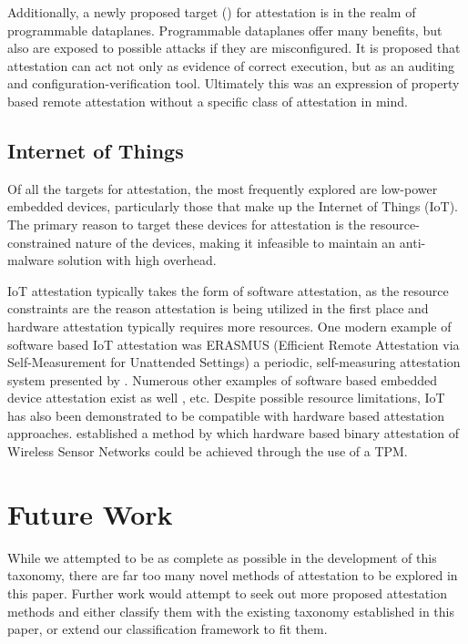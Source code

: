 \documentclass[acmsmall]{acmart}
\theoremstyle{definition}
\begin{document}
Additionally, a newly proposed target (\citet{sultanasy22acase}) for attestation is in the realm of programmable dataplanes.
Programmable dataplanes offer many benefits, but also are exposed to possible attacks if they are misconfigured. It is proposed that attestation can act not only as evidence of correct execution, but as an auditing and configuration-verification tool. Ultimately this was an expression of property based remote attestation without a specific class of attestation in mind.


\subsection{Internet of Things}
Of all the targets for attestation, the most frequently explored are low-power embedded devices, particularly those that make up the Internet of Things (IoT).
The primary reason to target these devices for attestation is the resource-constrained nature of the devices, making it infeasible to 
maintain an anti-malware solution with high overhead.

IoT attestation typically takes the form of software attestation,
as the resource constraints are the reason attestation is being
utilized in the first place and hardware attestation typically requires
more resources.
One modern example of software based IoT attestation was ERASMUS (Efficient Remote Attestation via Self-Measurement for Unattended Settings) a periodic, self-measuring attestation system presented by \citet{carpent2018erasmus}.
Numerous other examples of software based embedded device attestation exist as well \cite{Javaid:2020:Defining-Trust-IoT-Blockchain-Attestation,nunes2019vrased,Nunes:2021:TOCTOU-Remote-Attestation}, etc.
Despite possible resource limitations, IoT has also been demonstrated 
to be compatible with hardware based attestation approaches.
\citet{Tan:2011:TRAP} established a method by which hardware based binary attestation of Wireless Sensor Networks could be achieved through the use of a TPM. 


\section{Future Work} \label{sec:Future-Work}
While we attempted to be as complete as possible in the development of this taxonomy,
there are far too many novel methods of attestation to be explored
in this paper. Further work would attempt to seek out more proposed attestation methods
and either classify them with the existing taxonomy established in this paper, or
extend our classification framework to fit them.
\end{document}
